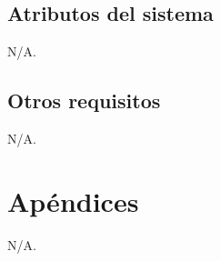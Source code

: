 \documentclass[11pt,a4paper]{article}
\begin{document}
\subsection{Atributos del sistema}
\label{sec:orgd0babc0}

N/A.

\subsection{Otros requisitos}
\label{sec:org31d2978}

N/A.


\section{Apéndices}
\label{sec:org75cea03}

N/A.
\end{document}
